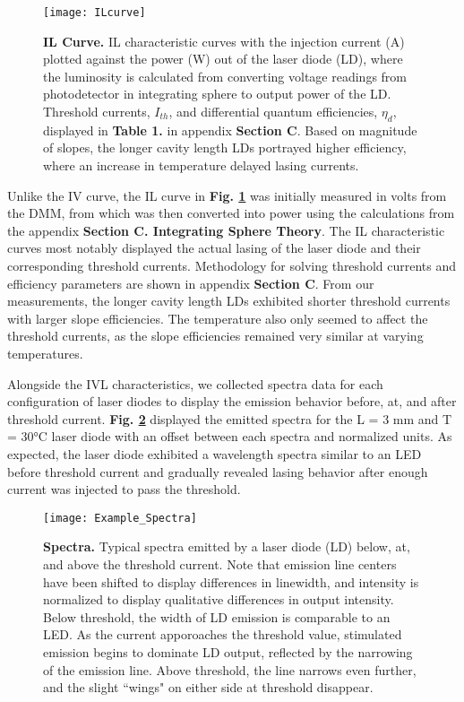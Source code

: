 \documentclass[9pt,twocolumn,twoside]{osajnl}
\begin{document}
\begin{figure}[hbtp]
\centering
\texttt{[image: ILcurve]}
\centering
\caption{\textbf{IL Curve.} IL characteristic curves with the injection current (A) plotted against the power (W) out of the laser diode (LD), where the luminosity is calculated from converting voltage readings from photodetector in integrating sphere to output power of the LD. Threshold currents, $I_{th}$, and differential quantum efficiencies, $\eta_d$, displayed in \textbf{Table 1.} in appendix \textbf{Section C}. Based on magnitude of slopes, the longer cavity length LDs portrayed higher efficiency, where an increase in temperature delayed lasing currents.}
\label{fig:IL}
\end{figure}

Unlike the IV curve, the IL curve in \textbf{Fig. \ref{fig:IL}} was initially measured in volts from the DMM, from which was then converted into power using the calculations from the appendix \textbf{Section C. Integrating Sphere Theory}. The IL characteristic curves most notably displayed the actual lasing of the laser diode and their corresponding threshold currents. Methodology for solving threshold currents and efficiency parameters are shown in appendix \textbf{Section C}. From our measurements, the longer cavity length LDs exhibited shorter threshold currents with larger slope efficiencies. The temperature also only seemed to affect the threshold currents, as the slope efficiencies remained very similar at varying temperatures. 

Alongside the IVL characteristics, we collected spectra data for each configuration of laser diodes to display the emission behavior before, at, and after threshold current. \textbf{Fig. \ref{fig:spectra}} displayed the emitted spectra for the L = 3 mm and T = 30°C laser diode with an offset between each spectra and normalized units. As expected, the laser diode exhibited a wavelength spectra similar to an LED before threshold current and gradually revealed lasing behavior after enough current was injected to pass the threshold. 


\begin{figure}[hbtp]
\centering
\texttt{[image: Example\_Spectra]}
\caption{\textbf{Spectra.} Typical spectra emitted by a laser diode (LD) below, at, and above the threshold current. Note that emission line centers have been shifted to display differences in linewidth, and intensity is normalized to display qualitative differences in output intensity. Below threshold, the width of LD emission is comparable to an LED. As the current apporoaches the threshold value, stimulated emission begins to dominate LD output, reflected by the narrowing of the emission line. Above threshold, the line narrows even further, and the slight ``wings" on either side at threshold disappear.}
\label{fig:spectra}
\end{figure}
\end{document}
